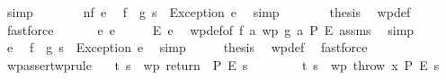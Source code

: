 \begin{isabellebody}
\ simp\isanewline
\ \ \ \ \isamarkupfalse%
\ \isamarkupfalse%
\ nf\ e\ \isamarkupfalse%
\ {\isachardoublequoteopen}{\isacharparenleft}{\kern0pt}f\ {\isasymbind}\ g{\isacharparenright}{\kern0pt}\ s\ {\isacharequal}{\kern0pt}\ Exception\ e{\isachardoublequoteclose}\ \isamarkupfalse%
\ simp\isanewline
\ \ \ \ \isamarkupfalse%
\ \isamarkupfalse%
\ {\isacharquery}{\kern0pt}thesis\ \isamarkupfalse%
\ wp{\isacharunderscore}{\kern0pt}def\ \isamarkupfalse%
\ fastforce\isanewline
\ \ \isamarkupfalse%
\isanewline
{}\isamarkupfalse%
\isanewline
\ \ \isamarkupfalse%
\ {\isacharparenleft}{\kern0pt}e\ e{\isacharparenright}{\kern0pt}\isanewline
\ \ \isamarkupfalse%
\ \isamarkupfalse%
\ {\isachardoublequoteopen}E\ e{\isachardoublequoteclose}\ \isamarkupfalse%
\ wp{\isacharunderscore}{\kern0pt}def{\isacharbrackleft}{\kern0pt}of\ f\ {\isachardoublequoteopen}{\isasymlambda}a{\isachardot}{\kern0pt}\ wp\ {\isacharparenleft}{\kern0pt}g\ a{\isacharparenright}{\kern0pt}\ P\ E{\isachardoublequoteclose}{\isacharbrackright}{\kern0pt}\ assms\ \isamarkupfalse%
\ simp\isanewline
\ \ \isamarkupfalse%
\ \isamarkupfalse%
\ e\ \isamarkupfalse%
\ {\isachardoublequoteopen}{\isacharparenleft}{\kern0pt}f\ {\isasymbind}\ g{\isacharparenright}{\kern0pt}\ s\ {\isacharequal}{\kern0pt}\ Exception\ e{\isachardoublequoteclose}\ \isamarkupfalse%
\ simp\isanewline
\ \ \isamarkupfalse%
\ \isamarkupfalse%
\ {\isacharquery}{\kern0pt}thesis\ \isamarkupfalse%
\ wp{\isacharunderscore}{\kern0pt}def\ \isamarkupfalse%
\ fastforce\isanewline
{}\isamarkupfalse%
%
\endisatagproof
{\isafoldproof}%
%
\isadelimproof
\isanewline
%
\endisadelimproof
\isanewline
{}\isamarkupfalse%
\ wpassert{\isacharbrackleft}{\kern0pt}wprule{\isacharbrackright}{\kern0pt}{\isacharcolon}{\kern0pt}\isanewline
\ \ \ {\isachardoublequoteopen}t\ s\ {\isasymLongrightarrow}\ wp\ {\isacharparenleft}{\kern0pt}return\ {\isacharparenleft}{\kern0pt}{\isacharparenright}{\kern0pt}{\isacharparenright}{\kern0pt}\ P\ E\ s{\isachardoublequoteclose}\isanewline
\ \ \ \ \ \ \ {\isachardoublequoteopen}{\isasymnot}\ t\ s\ {\isasymLongrightarrow}\ wp\ {\isacharparenleft}{\kern0pt}throw\ x{\isacharparenright}{\kern0pt}\ P\ E\ s{\isachardoublequoteclose}\isanewline

\end{isabellebody}

